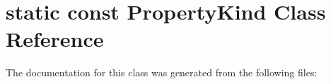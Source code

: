 \hypertarget{classstatic_01const_01PropertyKind}{}\section{static const Property\+Kind Class Reference}
\label{classstatic_01const_01PropertyKind}


The documentation for this class was generated from the following files\+:
